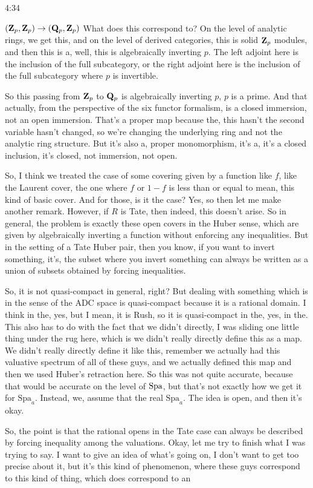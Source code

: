 \begin{unfinished}{4:34}
\begin{example}
$ (\mathbf Z_p, \mathbf Z_p) \rightarrow (\mathbf Q_p, \mathbf Z_p)$
What does this correspond to? On the level of analytic rings, we get this, and on the level of derived categories, this is solid $\mathbf Z_p$ modules, and then this is a, well, this is algebraically inverting $p$. The left adjoint here is the inclusion of the full subcategory, or the right adjoint here is the inclusion of the full subcategory where $p$ is invertible.

So this passing from $\mathbf Z_p$ to $\mathbf Q_p$ is algebraically inverting $p$, $p$ is a prime. And that actually, from the perspective of the six functor formalism, is a closed immersion, not an open immersion. That's a proper map because the, this hasn't the second variable hasn't changed, so we're changing the underlying ring and not the analytic ring structure. But it's also a, proper monomorphism, it's a, it's a closed inclusion, it's closed, not immersion, not open.

So, I think we treated the case of some covering given by a function like $f$, like the Laurent cover,  the one where $f$ or $1-f$ is less than or equal to mean, this kind of basic cover. And for those, is it the case? Yes, so then let me make another remark. However, if $R$ is Tate, then indeed, this doesn't arise. So in general, the problem is exactly these open covers in the Huber sense, which are given by algebraically inverting a function without enforcing any inequalities. But in the setting of a Tate Huber pair, then you know, if you want to invert something, it's, the subset where you invert something can always be written as a union of subsets obtained by forcing inequalities.

So, it is not quasi-compact in general, right? But dealing with something which is in the sense of the ADC space is quasi-compact because it is a rational domain. I think in the, yes, but I mean, it is Rush, so it is quasi-compact in the, yes, in the. This also has to do with the fact that we didn't directly, I was sliding one little thing under the rug here, which is we didn't really directly define this as a map. We didn't really directly define it like this, remember we actually had this valuative spectrum of all of these guys, and we actually defined this map and then we used Huber's retraction here. So this was not quite accurate, because that would be accurate on the level of $\operatorname{Spa}$, but that's not exactly how we get it for $\mathrm{Spa}_a$. Instead, we, assume that the real $\mathrm{Spa}_a$. The idea is open, and then it's okay.

So, the point is that the rational opens in the Tate case can always be described by forcing inequality among the valuations. Okay, let me try to finish what I was trying to say. I want to give an idea of what's going on, I don't want to get too precise about it, but it's this kind of phenomenon, where these guys correspond to this kind of thing, which does correspond to an


\end{example}
\end{unfinished}
